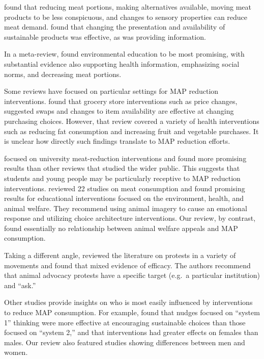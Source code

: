 \documentclass[sn-nature,referee,pdflatex]{sn-jnl}
\begin{document}
\citep{bianchi2018restructuring} found that reducing meat portions,
making alternatives available, moving meat products to be less
conspicuous, and changes to sensory properties can reduce meat demand.
\citep{pandey2023} found that changing the presentation and availability
of sustainable products was effective, as was providing information.

In a meta-review, \citep{grundy2022} found environmental education to be
most promising, with substantial evidence also supporting health
information, emphasizing social norms, and decreasing meat portions.

Some reviews have focused on particular settings for MAP reduction
interventions. \citep{hartmannboyce2018} found that grocery store
interventions such as price changes, suggested swaps and changes to item
availability are effective at changing purchasing choices. However, that
review covered a variety of health interventions such as reducing fat
consumption and increasing fruit and vegetable purchases. It is unclear
how directly such findings translate to MAP reduction efforts.

\citep{chang2023} focused on university meat-reduction interventions and
found more promising results than other reviews that studied the wider
public. This suggests that students and young people may be particularly
receptive to MAP reduction interventions. \citep{harguess2020} reviewed
22 studies on meat consumption and found promising results for
educational interventions focused on the environment, health, and animal
welfare. They recommend using animal imagery to cause an emotional
response and utilizing choice architecture interventions. Our review, by
contrast, found essentially no relationship between animal welfare
appeals and MAP consumption.

Taking a different angle, \citep{adleberg2018} reviewed the literature
on protests in a variety of movements and found that mixed evidence of
efficacy. The authors recommend that animal advocacy protests have a
specific target (e.g.~a particular institution) and ``ask.''

Other studies provide insights on who is most easily influenced by
interventions to reduce MAP consumption. For example,
\citep{blackford2021} found that nudges focused on ``system 1'' thinking
were more effective at encouraging sustainable choices than those
focused on ``system 2,'' and that interventions had greater effects on
females than males. Our review also featured studies showing differences
between men and women.
\end{document}
